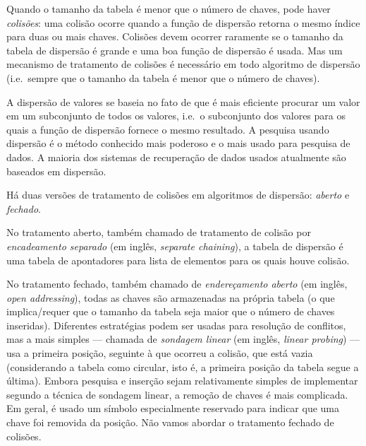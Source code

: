   Quando o tamanho da tabela é menor que o número
de chaves, pode haver {\em colisões\/}: uma colisão ocorre quando a
função de dispersão retorna o mesmo índice para duas ou mais
chaves. Colisões devem ocorrer raramente se o tamanho da tabela de
dispersão é grande e uma boa função de dispersão é usada. Mas um
mecanismo de tratamento de colisões é necessário em todo algoritmo de
dispersão (i.e.~sempre que o tamanho da tabela é menor que o número de
chaves).

A dispersão de valores se baseia no fato de que é mais eficiente
procurar um valor em um subconjunto de todos os valores, i.e.~o
subconjunto dos valores para os quais a função de dispersão fornece o
mesmo resultado. A pesquisa usando dispersão é o método conhecido mais
poderoso e o mais usado para pesquisa de dados. A maioria dos sistemas
de recuperação de dados usados atualmente são baseados em dispersão.

Há duas versões de tratamento de colisões em algoritmos de dispersão:
{\em aberto\/} e {\em fechado}. 

No tratamento aberto, também chamado de tratamento de colisão por {\em
  encadeamento separado\/} (em inglês, {\em separate chaining\/}), a
tabela de dispersão é uma tabela de apontadores para lista de
elementos para os quais houve colisão.

No tratamento fechado, também chamado de {\em endereçamento aberto\/}
(em inglês, {\em open addressing\/}), todas as chaves são armazenadas
na própria tabela (o que implica/requer que o tamanho da tabela seja
maior que o número de chaves inseridas). Diferentes estratégias podem
ser usadas para resolução de conflitos, mas a mais simples --- chamada
de {\em sondagem linear\/} (em inglês, {\em linear probing\/}) --- usa
a primeira posição, seguinte à que ocorreu a colisão, que está vazia
(considerando a tabela como circular, isto é, a primeira posição da
tabela segue a última). Embora pesquisa e inserção sejam relativamente
simples de implementar segundo a técnica de sondagem linear, a remoção
de chaves é mais complicada. Em geral, é usado um símbolo
especialmente reservado para indicar que uma chave foi removida da
posição. Não vamos abordar o tratamento fechado de colisões.


